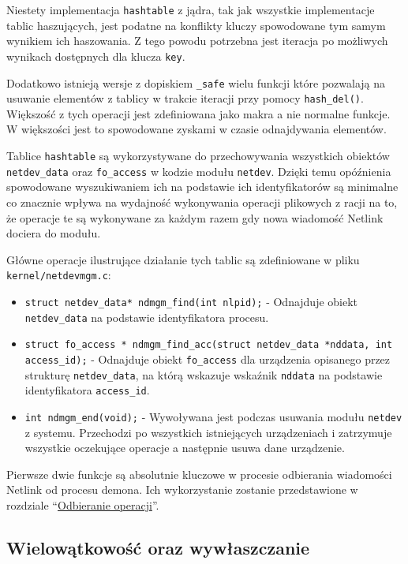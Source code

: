 \documentclass[10pt]{article}
\begin{document}
Niestety implementacja \texttt{hashtable} z jądra, tak jak wszystkie
implementacje tablic haszujących, jest podatne na konflikty kluczy
spowodowane tym samym wynikiem ich haszowania. Z tego powodu potrzebna
jest iteracja po możliwych wynikach dostępnych dla klucza \texttt{key}.

Dodatkowo istnieją wersje z dopiskiem \texttt{\_safe} wielu funkcji
które pozwalają na usuwanie elementów z tablicy w trakcie iteracji przy
pomocy \texttt{hash\_del()}. Większość z tych operacji jest zdefiniowana
jako makra a nie normalne funkcje. W większości jest to spowodowane
zyskami w czasie odnajdywania elementów.

Tablice \texttt{hashtable} są wykorzystywane do przechowywania
wszystkich obiektów \texttt{netdev\_data} oraz \texttt{fo\_access} w
kodzie modułu \texttt{netdev}. Dzięki temu opóźnienia spowodowane
wyszukiwaniem ich na podstawie ich identyfikatorów są minimalne co
znacznie wpływa na wydajność wykonywania operacji plikowych z racji na
to, że operacje te są wykonywane za każdym razem gdy nowa wiadomość
Netlink dociera do modułu.

Główne operacje ilustrujące działanie tych tablic są zdefiniowane w
pliku \texttt{kernel/netdevmgm.c}:

\begin{itemize}
\itemsep1pt\parskip0pt
\item
  \texttt{struct netdev\_data* ndmgm\_find(int nlpid);} - Odnajduje
  obiekt \texttt{netdev\_data} na podstawie identyfikatora procesu.
\item
  \texttt{struct fo\_access * ndmgm\_find\_acc(struct netdev\_data *nddata, int access\_id);}
  - Odnajduje obiekt \texttt{fo\_access} dla urządzenia opisanego przez
  strukturę \texttt{netdev\_data}, na którą wskazuje wskaźnik
  \texttt{nddata} na podstawie identyfikatora \texttt{access\_id}.
\item
  \texttt{int ndmgm\_end(void);} - Wywoływana jest podczas usuwania
  modułu \texttt{netdev} z systemu. Przechodzi po wszystkich
  istniejących urządzeniach i zatrzymuje wszystkie oczekujące operacje a
  następnie usuwa dane urządzenie.
\end{itemize}

Pierwsze dwie funkcje są absolutnie kluczowe w procesie odbierania
wiadomości Netlink od procesu demona. Ich wykorzystanie zostanie
przedstawione w rozdziale ``\hyperref[odbieranie-operacji]{Odbieranie
operacji}''.

\subsection{Wielowątkowość oraz wywłaszczanie}
\end{document}
